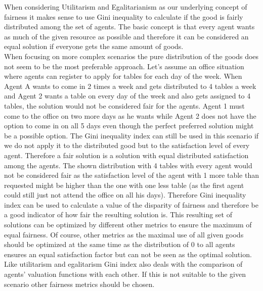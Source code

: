 \documentclass[german, a4paper, 11pt, oneside]{scrbook}
\begin{document}
When considering Utilitarism and Egalitarianism as our underlying concept of fairness it makes sense to use Gini inequality to calculate if the good is fairly distributed among the set of agents. The basic concept is that every agent wants as much of the given resource as possible and therefore it can be considered an equal solution if everyone gets the same amount of goods. \\When focusing on more complex scenarios the pure distribution of the goods does not seem to be the most preferable approach. Let's assume an office situation where agents can register to apply for tables for each day of the week. When Agent A wants to come in 2 times a week and gets distributed to 4 tables a week and Agent 2 wants a table on every day of the week and also gets assigned to 4 tables, the solution would not be considered fair for the agents. Agent 1 must come to the office on two more days as he wants while Agent 2 does not have the option to come in on all 5 days even though the perfect preferred solution might be a possible option. The Gini inequality index can still be used in this scenario if we do not apply it to the distributed good but to the satisfaction level of every agent. Therefore a fair solution is a solution with equal distributed satisfaction among the agents. The shown distribution with 4 tables with every agent would not be considered fair as the satisfaction level of the agent with 1 more table than requested might be higher than the one with one less table (as the first agent could still just not attend the office on all his days). Therefore Gini inequality index can be used to calculate a value of the disparity of fairness and therefore be a good indicator of how fair the resulting solution is. This resulting set of solutions can be optimized by different other metrics to ensure the maximum of equal fairness. Of course, other metrics as the maximal use of all given goods should be optimized at the same time as the distribution of 0 to all agents ensures an equal satisfaction factor but can not be seen as the optimal solution. Like utilitarism and egalitarism Gini index also deals with the comparison of agents' valuation functions with each other. If this is not suitable to the given scenario other fairness metrics should be chosen.
\end{document}
